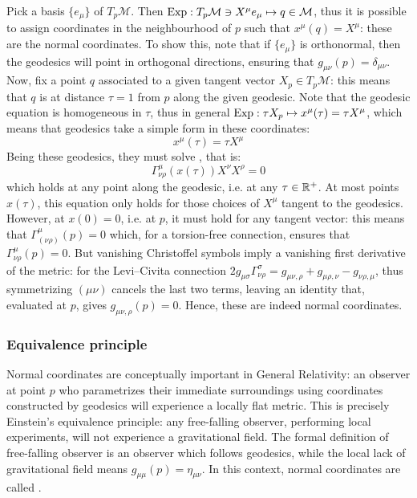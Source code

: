 Pick a basis $ \{e_\mu\} $ of $ T_p \mathcal{M} $. Then $ \operatorname{Exp} : T_p \mathcal{M} \ni X^\mu e_\mu \mapsto q \in \mathcal{M} $, thus it is possible to assign coordinates in the neighbourhood of $ p $ such that $ x^\mu(q) = X^\mu $: these are the normal coordinates. To show this, note that if $ \{e_\mu\} $ is orthonormal, then the geodesics will point in orthogonal directions, ensuring that $ g_{\mu \nu}(p) = \delta_{\mu \nu} $. Now, fix a point $ q $ associated to a given tangent vector $ X_p \in T_p \mathcal{M} $: this means that $ q $ is at distance $ \tau = 1 $ from $ p $ along the given geodesic. Note that the geodesic equation is homogeneous in $ \tau $, thus in general $ \operatorname{Exp} : \tau X_p \mapsto x^\mu(\tau) = \tau X^\mu $, which means that geodesics take a simple form in these coordinates:
\begin{equation*}
  x^\mu (\tau) = \tau X^\mu
\end{equation*}
Being these geodesics, they must solve , that is:
\begin{equation*}
  \Gamma^\mu_{\nu \rho}(x(\tau)) X^\nu X^\rho = 0
\end{equation*}
which holds at any point along the geodesic, i.e. at any $ \tau \in \mathbb{R}^+ $. At most points $ x(\tau) $, this equation only holds for those choices of $ X^\mu $ tangent to the geodesics. However, at $ x(0) = 0 $, i.e. at $ p $, it must hold for any tangent vector: this means that $ \Gamma^\mu_{(\nu \rho)}(p) = 0 $ which, for a torsion-free connection, ensures that $ \Gamma^\mu_{\nu \rho}(p) = 0 $. But vanishing Christoffel symbols imply a vanishing first derivative of the metric: for the Levi--Civita connection $ 2g_{\mu \sigma} \Gamma^\sigma_{\nu \rho} = g_{\mu \nu, \rho} + g_{\mu \rho, \nu} - g_{\nu \rho, \mu} $, thus symmetrizing $ (\mu \nu) $ cancels the last two terms, leaving an identity that, evaluated at $ p $, gives $ g_{\mu \nu, \rho}(p) = 0 $. Hence, these are indeed normal coordinates.

\subsubsection{Equivalence principle}

Normal coordinates are conceptually important in General Relativity: an observer at point $ p $ who parametrizes their immediate surroundings using coordinates constructed by geodesics will experience a locally flat metric. This is precisely Einstein's equivalence principle: any free-falling observer, performing local experiments, will not experience a gravitational field. The formal definition of free-falling observer is an observer which follows geodesics, while the local lack of gravitational field means $ g_{\mu \mu}(p) = \eta_{\mu \nu} $. In this context, normal coordinates are called .

